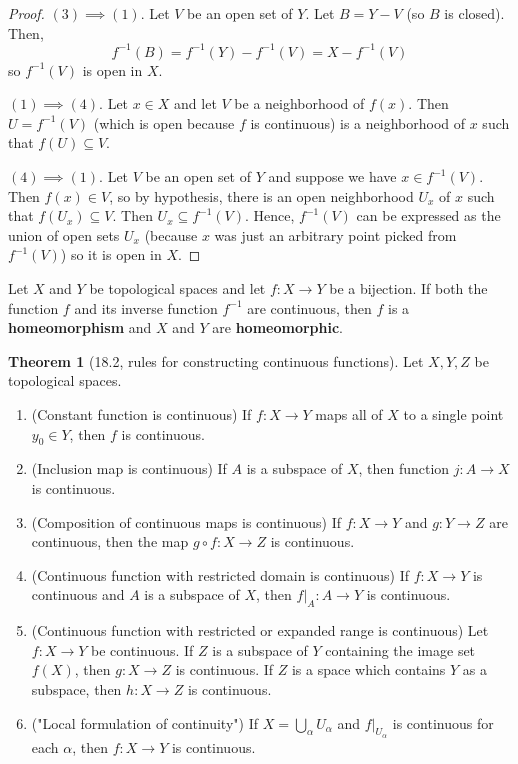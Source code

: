 \documentclass{article}
\newcommand{\nline}{\vspace*{0.5\baselineskip}}
\theoremstyle{definition}
\newtheorem{theorem}{Theorem}[subsection]
\begin{document}
\begin{flushleft}
\begin{proof}
\nline

$(3) \implies (1)$. Let $V$ be an open set of $Y$. Let $B = Y - V$ (so $B$ is closed). Then,
\[
f^{-1}(B) = f^{-1}(Y) - f^{-1}(V) = X - f^{-1}(V)
\]
so $f^{-1}(V)$ is open in $X$.

\nline

$(1) \implies (4)$. Let $x \in X$ and let $V$ be a neighborhood of $f(x)$. Then $U = f^{-1}(V)$ (which is open because $f$ is continuous) is a neighborhood of $x$ such that $f(U) \subseteq V$.

\nline

$(4) \implies (1)$. Let $V$ be an open set of $Y$ and suppose we have $x \in f^{-1}(V)$. Then $f(x) \in V$, so by hypothesis, there is an open neighborhood $U_x$ of $x$ such that $f(U_x) \subseteq V$. Then $U_x \subseteq f^{-1}(V)$. Hence, $f^{-1}(V)$ can be expressed as the union of open sets $U_x$ (because $x$ was just an arbitrary point picked from $f^{-1}(V)$) so it is open in $X$.
\end{proof}

Let $X$ and $Y$ be topological spaces and let $f : X \to Y$ be a bijection. If both the function $f$ and its inverse function $f^{-1}$ are continuous, then $f$ is a \textbf{homeomorphism} and $X$ and $Y$ are \textbf{homeomorphic}.

\begin{theorem}[18.2, rules for constructing continuous functions]
Let $X, Y, Z$ be topological spaces.
\begin{enumerate}
    \item (Constant function is continuous) If $f : X \to Y$ maps all of $X$ to a single point $y_0 \in Y$, then $f$ is continuous.
    \item (Inclusion map is continuous) If $A$ is a subspace of $X$, then function $j : A \to X$ is continuous.
    \item (Composition of continuous maps is continuous) If $f: X \to Y$ and $g: Y \to Z$ are continuous, then the map $g \circ f : X \to Z$ is continuous.
    \item (Continuous function with restricted domain is continuous) If $f: X \to Y$ is continuous and $A$ is a subspace of $X$, then $f|_{A}: A \to Y$ is continuous.
    \item (Continuous function with restricted or expanded range is continuous) Let $f: X \to Y$ be continuous. If $Z$ is a subspace of $Y$ containing the image set $f(X)$, then $g : X \to Z$ is continuous. If $Z$ is a space which contains $Y$ as a subspace, then $h: X \to Z$ is continuous.
    \item ("Local formulation of continuity") If $X = \bigcup_{\alpha} U_\alpha$ and $f|_{U_\alpha}$ is continuous for each $\alpha$, then $f: X \to Y$ is continuous.
\end{enumerate}
\end{theorem}


\end{flushleft}
\end{document}
